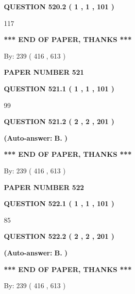 \documentclass[12pt]{article}
\begin{document}
  
{\textbf{\large{QUESTION
520.2 
 ( 1 , 1 , 101 )
}}}

117
   
   
   
   
\vspace{1.0in} 
{\textbf{\large{ *** END OF PAPER, THANKS *** }}} 
   
   
\hspace{1.0in} By: 
 239 ( 416 ,  613 )
   
   
   
   
\newpage 
\setcounter{page}{ 
   521001 } 
   
   
 {\textbf{ \Large{ PAPER NUMBER  521  }}}
   
   
   
   
  
  
{\textbf{\large{QUESTION
521.1 
 ( 1 , 1 , 101 )
}}}

99
  
  
{\textbf{\large{QUESTION
521.2 
 ( 2 , 2 , 201 )
}}}
 
 
{\textbf{(Auto-answer:}}
{\textbf{\large{
B.}}}
{\textbf{)}}
 
 
   
   
   
   
\vspace{1.0in} 
{\textbf{\large{ *** END OF PAPER, THANKS *** }}} 
   
   
\hspace{1.0in} By: 
 239 ( 416 ,  613 )
   
   
   
   
\newpage 
\setcounter{page}{ 
   522001 } 
   
   
 {\textbf{ \Large{ PAPER NUMBER  522  }}}
   
   
   
   
  
  
{\textbf{\large{QUESTION
522.1 
 ( 1 , 1 , 101 )
}}}

85
  
  
{\textbf{\large{QUESTION
522.2 
 ( 2 , 2 , 201 )
}}}
 
 
{\textbf{(Auto-answer:}}
{\textbf{\large{
B.}}}
{\textbf{)}}
 
 
   
   
   
   
\vspace{1.0in} 
{\textbf{\large{ *** END OF PAPER, THANKS *** }}} 
   
   
\hspace{1.0in} By: 
 239 ( 416 ,  613 )
   
   
   
\end{document}
